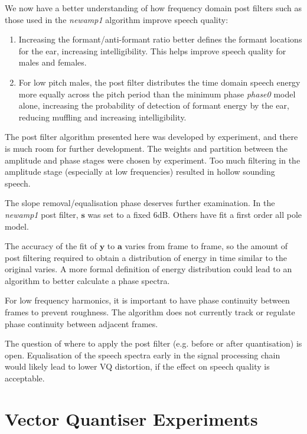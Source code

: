 \documentclass{article}
\begin{document}
We now have a better understanding of how frequency domain post filters such as those used in the \emph{newamp1} algorithm improve speech quality:
\begin{enumerate}
\item Increasing the formant/anti-formant ratio better defines the formant locations for the ear, increasing intelligibility. This helps improve speech quality for males and females.
\item For low pitch males, the post filter distributes the time domain speech energy more equally across the pitch period than the minimum phase \emph{phase0} model alone, increasing the probability of detection of formant energy by the ear, reducing muffling and increasing intelligibility.
\end{enumerate}

The post filter algorithm presented here was developed by experiment, and there is much room for further development. The weights and partition between the amplitude and phase stages were chosen by experiment. Too much filtering in the amplitude stage (especially at low frequencies) resulted in hollow sounding speech.

The slope removal/equalisation phase deserves further examination.  In the \emph{newamp1} post filter, $\mathbf{s}$ was set to a fixed 6dB.  Others \cite[Section 4.3, p 148]{kleijn1995speech} have fit a first order all pole model.

The accuracy of the fit of $\mathbf{y}$ to $\mathbf{a}$ varies from frame to frame, so the amount of post filtering required to obtain a distribution of energy in time similar to the original varies.  A more formal definition of energy distribution could lead to an algorithm to better calculate a phase spectra.

For low frequency harmonics, it is important to have phase continuity between frames to prevent roughness.  The algorithm does not currently track or regulate phase continuity between adjacent frames.

The question of where to apply the post filter (e.g. before or after quantisation) is open.  Equalisation of the speech spectra early in the signal processing chain would likely lead to lower VQ distortion, if the effect on speech quality is acceptable.

\section{Vector Quantiser Experiments}
\end{document}
